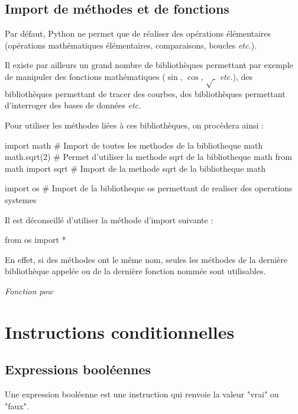 \documentclass[10pt]{article}
\begin{document}
\subsection{Import de méthodes et de fonctions}

Par défaut, Python ne permet que de réaliser des opérations élémentaires (opérations mathématiques élémentaires, comparaisons, boucles \textit{etc.}). 

Il existe par ailleurs un grand nombre de bibliothèques permettant par exemple de manipuler des fonctions mathématiques ($\sin$, $\cos$, $\sqrt{\;}$ \textit{etc.}), des bibliothèques permettant de tracer des courbes, des bibliothèques permettant d'interroger des bases de données \textit{etc.}

 

Pour utiliser les méthodes liées à ces bibliothèques, on procèdera ainsi :

\begin{py}
\begin{python}
import math  # Import de toutes les methodes de la bibliotheque math
math.sqrt(2) # Permet d'utiliser la methode sqrt de la bibliotheque math
from math import sqrt # Import de la methode sqrt de la bibliotheque math

import os # Import de la bibliotheque os permettant de realiser des operations systemes
\end{python}
\end{py} 

\begin{warn}
Il est déconseillé d'utiliser la méthode d'import suivante : 
\begin{python}
from os import *
\end{python}

En effet, si des méthodes ont le même nom, seules les méthodes de la dernière bibliothèque appelée ou de la dernière fonction nommée sont utilisables. 
\end{warn}


\begin{exemple}
\textit{Fonction pow}

\end{exemple}
\section{Instructions conditionnelles}



\subsection{Expressions booléennes}
\begin{defi}
Une expression booléenne est une instruction qui renvoie la valeur "vrai" ou "faux".
\end{defi}
\end{document}
